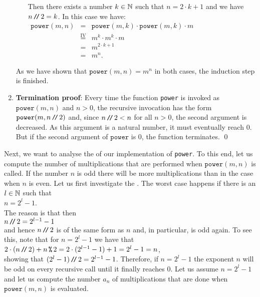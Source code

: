 \begin{enumerate}
\begin{enumerate}
            Then there exists a number $k \in {\mathbb N}$ such that $n = 2 \cdot k + 1$ and we have
            $n \mbox{\,\texttt{/}$\!$\texttt{/}\,} 2 = k$.  In this case we have:
            \\[0.2cm]
            \hspace*{1.3cm}
            $ 
            \begin{array}{lcl}
            \mathtt{power}(m,n) & = & \mathtt{power}(m,k) \cdot \mathtt{power}(m,k) \cdot m  \\[0.2cm]
                                & \stackrel{\mathrm{IV}}{=} & m^k \cdot m^k \cdot m  \\[0.2cm]
                                & = & m^{2\cdot k+1} \\[0.2cm]
                                & = & m^{n}.
            \end{array}
            $
      \end{enumerate}
      As we have shown that $\mathtt{power}(m,n) = m^n$ in both cases, the induction step is finished.
\item \textbf{Termination proof}:
      Every time the function \texttt{power} is invoked as $\mathtt{power}(m, n)$ and $n > 0$, the recursive
      invocation has the form $\mathtt{power}(m,n \mbox{\,\texttt{/}$\!$\texttt{/}\,} 2)$ and, since $n \mbox{\,\texttt{/}$\!$\texttt{/}\,} 2 < n$ for all $n > 0$, the second
      argument is decreased.  As this argument is a natural number, it must eventually reach $0$.  But if the
      second argument of $\mathtt{power}$ is $0$, the function terminates.
      \qed
\end{enumerate}
Next, we want to analyse the  of our implementation of \texttt{power}.
To this end, let us compute the number of multiplications that are performed when
$\mathtt{power}(m,n)$ is called.  If the number $n$ is odd there will be more multiplications than
in the case when $n$ is even.  Let us first investigate the .  
The worst case happens if there is an $l\in {\mathbb N}$ such that 
\\[0.2cm]
\hspace*{1.3cm}
$n = 2^l - 1$. 
\\[0.2cm]
The reason is that then
\\[0.2cm]
\hspace*{1.3cm} $n \mbox{\,\texttt{/}$\!$\texttt{/}\,} 2 = 2^{l-1} - 1$
\\[0.2cm]
and hence $n \mbox{\,\texttt{/}$\!$\texttt{/}\,} 2$ is of the same form as $n$ and, in particular, is odd again.  To see this, note that
for $n = 2^l - 1$ we have that
\\[0.2cm]
\hspace*{1.3cm}
$2 \cdot(n \dv 2) + n \,\texttt{\symbol{37}}\, 2 = 2 \cdot (2^{l-1} - 1) + 1 = 2^l - 1 = n$,
\\[0.2cm]
showing that $(2^l -1 ) \mbox{\,\texttt{/}$\!$\texttt{/}\,} 2 = 2^{l-1} -1$.
Therefore, if $n = 2^l - 1$ the exponent $n$ will be odd on every recursive call until it finally reaches $0$.
Let us assume $n = 2^l - 1$ and let us compute the number $a_n$ of multiplications that
are done when $\mathtt{power}(m,n)$ is evaluated. 

